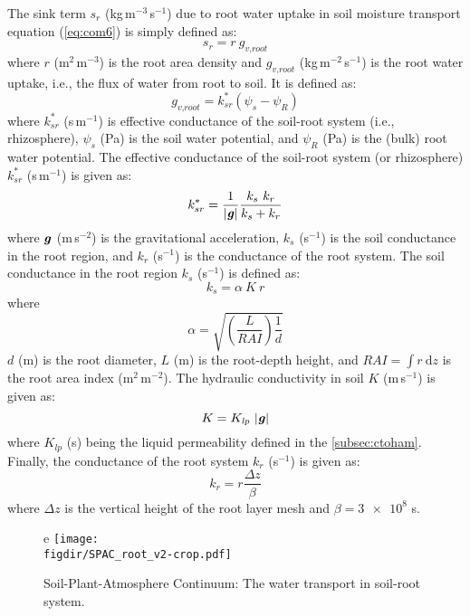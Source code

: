 The sink term $s_r$ (kg\,m$^{-3}$\,s$^{-1}$) due to root water uptake in soil moisture transport equation (\cref{eq:com6}) is simply defined as:
\begin{equation}
s_r = r ~ g_{\textit{v,root}}
\end{equation}
where $r$ (m$^2$\,m$^{-3}$) is the root area density and $g_{\textit{v,root}}$ (kg\,m$^{-2}$\,s$^{-1}$) is the root water uptake, i.e., the flux of water from root to soil. It is defined as:
\begin{equation}
g_{\textit{v,root}} = k_{sr}^*\left(\psi_s - \psi_R\right)
\end{equation}
where $k_{sr}^*$ (s\,m$^{-1}$) is effective conductance of the soil-root system (i.e., rhizosphere), $\psi_s$ (Pa) is the soil water potential, and $\psi_R$ (Pa) is the (bulk) root water potential. The effective conductance of the soil-root system (or rhizosphere) $k_{sr}^*$ (s\,m$^{-1}$) is given as:
\begin{equation}
k_{sr}^* = \frac{1}{|\textbf{\textit{g}}|} \frac{k_s~k_r}{k_s + k_r}
\end{equation}
where $\textbf{\textit{g}}$ (m\,s$^{-2}$) is the gravitational acceleration, $k_s$ (s$^{-1}$) is the soil conductance in the root region, and $k_r$ (s$^{-1}$) is the conductance of the root system. The soil conductance in the root region $k_s$ (s$^{-1}$) is defined as:
\begin{equation}
k_s = \alpha ~ K ~ r
\end{equation}
where
\begin{equation}
\alpha =  \sqrt{\left(\frac{L}{\textit{RAI}}\right) \frac{1}{d}}
\end{equation}
$d$ (m) is the root diameter, $L$ (m) is the root-depth height, and $\textit{RAI} = \int r~\mathrm{d}z$ is the root area index (m$^2$\,m$^{-2}$). The hydraulic conductivity in soil $K$ (m\,s$^{-1}$) is given as:
\begin{equation}
K = K_{\textit{lp}} ~ |\textbf{\textit{g}}|
\end{equation}
where $K_{\textit{lp}}$ (s) being the liquid permeability defined in the \cref{subsec:ctoham}. Finally, the conductance of the root system $k_r$ (s$^{-1}$) is given as:
\begin{equation}
k_r = r \frac{\Delta z}{\beta}
\end{equation}
where $\Delta z$ is the vertical height of the root layer mesh and $\beta = \num{3e8}$ s. 

\begin{figure}[t]
	\centering
e
	\texttt{[image: \\figdir/SPAC\_root\_v2-crop.pdf]}
	\caption{Soil-Plant-Atmosphere Continuum: The water transport in soil-root system.}
	\label{fig:SPAC_root}
\end{figure}

